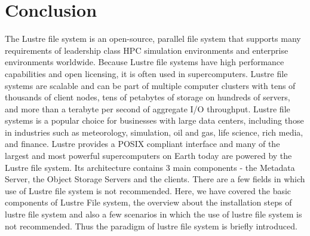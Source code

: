 \documentclass[9pt,twocolumn,twoside]{../../styles/osajnl}
\begin{document}
\section{Conclusion}

The Lustre file system is an open-source, parallel file system that
supports many requirements of leadership class HPC simulation
environments and enterprise environments worldwide. Because Lustre
file systems have high performance capabilities and open licensing, it
is often used in supercomputers. Lustre file systems are scalable and
can be part of multiple computer clusters with tens of thousands of
client nodes, tens of petabytes of storage on hundreds of servers, and
more than a terabyte per second of aggregate I/O throughput. Lustre
file systems is a popular choice for businesses with large data
centers, including those in industries such as meteorology,
simulation, oil and gas, life science, rich media, and finance. Lustre
provides a POSIX compliant interface and many of the largest and most
powerful supercomputers on Earth today are powered by the Lustre file
system. Its architecture contains 3 main components - the Metadata
Server, the Object Storage Servers and the clients. There are a few
fields in which use of Lustre file system is not recommended. Here, we
have covered the basic components of Lustre File system, the overview
about the installation steps of lustre file system and also a few
scenarios in which the use of lustre file system is not
recommended. Thus the paradigm of lustre file system is briefly
introduced.



\end{document}

